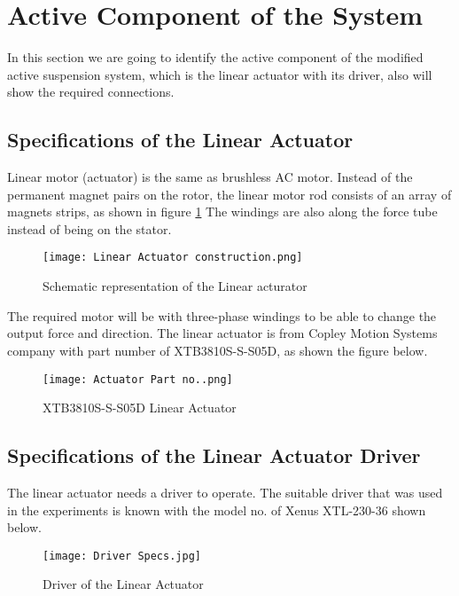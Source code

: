 \newpage
\section{Active Component of the System}
In this section we are going to identify the active component of the modified active suspension system, which is the linear actuator with its driver, also will show the required connections.

\subsection{Specifications of the Linear Actuator}
Linear motor (actuator) is the same as brushless AC motor. Instead of the permanent magnet pairs on the rotor, the linear motor rod consists of an array of magnets strips, as shown in figure \ref{fig:Actuator Construction} The windings are also along the force tube instead of being on the stator. 
\begin{figure}[H]
    \centering
    \texttt{[image: Linear Actuator construction.png]}
    \caption{Schematic representation of the Linear acturator \cite{nipponpulseLinearMotors}}
    \label{fig:Actuator Construction}
    
\end{figure}
The required motor will be with three-phase windings to be able to change the output force and direction.
\newline
The linear actuator is from Copley Motion Systems company\cite{copleymotion} with part number of XTB3810S-S-S05D, as shown the figure below.
\begin{figure}[H]
    \centering
    \texttt{[image: Actuator Part no..png]}
    \caption{XTB3810S-S-S05D Linear Actuator}
    \label{fig:Actuator}
    
\end{figure}
\newpage
\subsection{Specifications of the Linear Actuator Driver}
The linear actuator needs a driver to operate. The suitable driver that was used in the experiments is known with the model no. of Xenus XTL-230-36 shown below.
\begin{figure}[H]
    \centering
    \texttt{[image: Driver Specs.jpg]}
    \caption{Driver of the Linear Actuator}
    \label{fig:Driver}
    
\end{figure}

